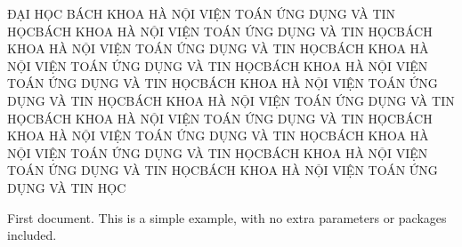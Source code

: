 \documentclass{article}
\begin{document}
ĐẠI HỌC BÁCH KHOA HÀ NỘI
\newpage
VIỆN TOÁN ỨNG DỤNG VÀ TIN HỌCBÁCH KHOA HÀ NỘI
\newpage
VIỆN TOÁN ỨNG DỤNG VÀ TIN HỌCBÁCH KHOA HÀ NỘI
\newpage
VIỆN TOÁN ỨNG DỤNG VÀ TIN HỌCBÁCH KHOA HÀ NỘI
\newpage
VIỆN TOÁN ỨNG DỤNG VÀ TIN HỌCBÁCH KHOA HÀ NỘI
\newpage
VIỆN TOÁN ỨNG DỤNG VÀ TIN HỌCBÁCH KHOA HÀ NỘI
\newpage
VIỆN TOÁN ỨNG DỤNG VÀ TIN HỌCBÁCH KHOA HÀ NỘI
\newpage
VIỆN TOÁN ỨNG DỤNG VÀ TIN HỌCBÁCH KHOA HÀ NỘI
\newpage
VIỆN TOÁN ỨNG DỤNG VÀ TIN HỌCBÁCH KHOA HÀ NỘI
\newpage
VIỆN TOÁN ỨNG DỤNG VÀ TIN HỌCBÁCH KHOA HÀ NỘI
\newpage
VIỆN TOÁN ỨNG DỤNG VÀ TIN HỌCBÁCH KHOA HÀ NỘI
\newpage
VIỆN TOÁN ỨNG DỤNG VÀ TIN HỌCBÁCH KHOA HÀ NỘI
\newpage
VIỆN TOÁN ỨNG DỤNG VÀ TIN HỌC

First document. This is a simple example, with no
extra parameters or packages included.
\end{document}
